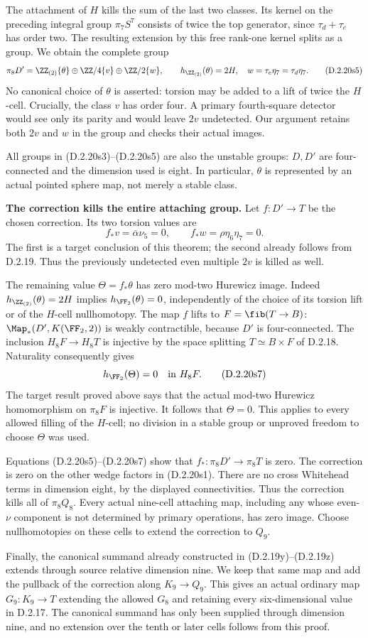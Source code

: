 The attachment of $H$ kills the sum of the last two
classes. Its kernel on the preceding integral group
$\pi_7S^7$ consists of twice the top generator,
since $\tau_d+\tau_e$ has order two.
The resulting extension by this free rank-one kernel
splits as a group. We obtain the complete group
\[
 \pi_8D'=
 \ZZ_{(2)}\{\theta\}\oplus\ZZ/4\{v\}
                      \oplus\ZZ/2\{w\},
 \qquad
 h_{\ZZ_{(2)}}(\theta)=2H,\quad
 w=\tau_e\eta_7=\tau_d\eta_7.
 \tag{D.2.20s5}
\]
No canonical choice of $\theta$ is asserted: torsion
may be added to a lift of twice the $H$-cell. Crucially,
the class $v$ has order four. A primary fourth-square
detector would see only its parity and would leave
$2v$ undetected. Our argument retains both $2v$ and
$w$ in the group and checks their actual images.

All groups in \textup{(D.2.20s3)--(D.2.20s5)} are
also the unstable groups: $D,D'$ are four-connected
and the dimension used is eight. In particular,
$\theta$ is represented by an actual pointed sphere
map, not merely a stable class.

\medskip\noindent
\textbf{The correction kills the entire attaching group.}
Let $f:D'\to T$ be the chosen correction. Its two
torsion values are
\[
 f_*v=\overline\alpha\nu_5=0,\qquad
 f_*w=\rho\eta_6\eta_7=0.
 \tag{D.2.20s6}
\]
The first is a target conclusion of this theorem;
the second already follows from D.2.19. Thus the
previously undetected even multiple $2v$ is killed
as well.

The remaining value $\Theta=f_*\theta$ has zero
mod-two Hurewicz image. Indeed
$h_{\ZZ_{(2)}}(\theta)=2H$ implies
$h_{\FF_2}(\theta)=0$, independently of the choice
of its torsion lift or of the $H$-cell nullhomotopy.
The map $f$ lifts to $F=\fib(T\to B)$:
$\Map_*(D',K(\FF_2,2))$ is weakly contractible,
because $D'$ is four-connected. The inclusion
$H_8F\to H_8T$ is injective by the space splitting
$T\simeq B\times F$ of D.2.18. Naturality consequently
gives
\[
 h_{\FF_2}(\Theta)=0\quad\hbox{in }H_8F.
 \tag{D.2.20s7}
\]
The target result proved above says that the actual
mod-two Hurewicz homomorphism on $\pi_8F$ is
injective. It follows that $\Theta=0$.
This applies to every allowed filling of the $H$-cell;
no division in a stable group or unproved freedom
to choose $\Theta$ was used.

Equations \textup{(D.2.20s5)--(D.2.20s7)} show
that $f_*:\pi_8D'\to\pi_8T$ is zero. The
correction is zero on the other wedge factors in
\textup{(D.2.20s1)}. There are no cross Whitehead
terms in dimension eight, by the displayed
connectivities. Thus the correction kills all of
$\pi_8Q_8$. Every actual nine-cell attaching map,
including any whose even-$\nu$ component is not
determined by primary operations, has zero image.
Choose nullhomotopies on these cells to extend
the correction to $Q_9$.

Finally, the canonical summand already constructed
in \textup{(D.2.19y)--(D.2.19z)} extends through
source relative dimension nine. We keep that same
map and add the pullback of the correction along
$K_9\to Q_9$. This gives an actual ordinary map
$G_9:K_9\to T$ extending the allowed $G_8$ and
retaining every six-dimensional value in D.2.17.
The canonical summand has only been supplied
through dimension nine, and no extension over
the tenth or later cells follows from this proof.
